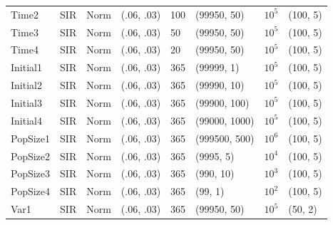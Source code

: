 \documentclass[12pt]{article}
\begin{document}
\begin{table}[]
\begin{tabular}{@{}llllllll@{}}
  Time2 & SIR &  Norm   & (.06, .03)                          &     100       &  (99950, 50)                    &  $10^5$          &(100, 5)                                \\
  Time3 & SIR &  Norm   & (.06, .03)                          &     50       &  (99950, 50)                    &  $10^5$          &(100, 5)                                \\
  Time4 & SIR &  Norm   & (.06, .03)                          &     20       &  (99950, 50)                    &  $10^5$          &(100, 5)                                \\ \midrule
  Initial1    & SIR      &   Norm             & (.06, .03)                          &     365       &  (99999, 1)                    &  $10^5$          &(100, 5)                                \\
  Initial2    & SIR      &   Norm             & (.06, .03)                          &     365       &  (99990, 10)                    &  $10^5$          &(100, 5)                                \\
  Initial3    & SIR      &   Norm             & (.06, .03)                          &     365       &  (99900, 100)                    &  $10^5$          &(100, 5)                                \\
  Initial4    & SIR      &   Norm             & (.06, .03)                          &     365       &  (99000, 1000)                    &  $10^5$          &(100, 5)                                \\ \midrule
PopSize1      & SIR      &   Norm             & (.06, .03)                          &     365       &  (999500, 500)                    &  $10^6$          &(100, 5)                                \\
PopSize2      & SIR      &   Norm             & (.06, .03)                          &     365       &  (9995, 5)                    &  $10^4$          &(100, 5)                                \\
PopSize3        & SIR      &   Norm             & (.06, .03)                          &     365       &  (990, 10)                    &  $10^3$          &(100, 5)                                \\
PopSize4       & SIR      &   Norm             & (.06, .03)                          &     365       &  (99, 1)                    &  $10^2$          &(100, 5)                                \\
 \midrule
  Var1      & SIR      &   Norm             & (.06, .03)                          &     365       &  (99950, 50)                    &  $10^5$          &(50, 2)                                \\

\end{tabular}
\end{table}
\end{document}
